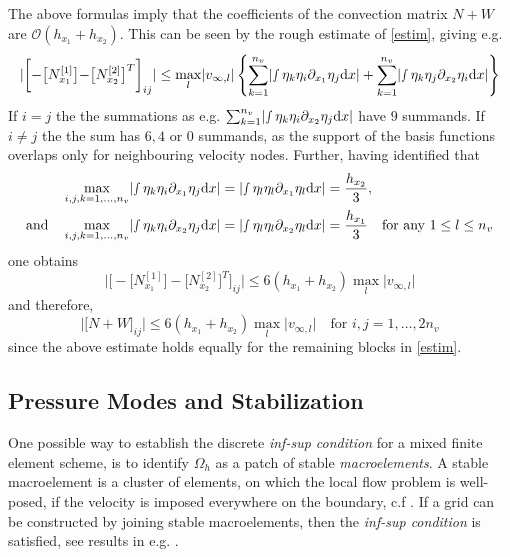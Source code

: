 \documentclass[a4paper,10pt,BCOR=15mm]{scrbook}
\providecommand{\abs}[1]{\lvert#1\rvert}
\providecommand{\inva}[1]{\text{d} #1}
\begin{document}
\begin{rem}\label{symd}
 The above formulas imply that the coefficients of the convection matrix $N+W$ are $\mathcal O(h_{x_1}+h_{x_2})$. This can be seen by the rough estimate of \eqref{estim}, giving e.g.
\begin{equation*}
 \abs{ \biggl [-\bigr [N_{x_1}^{[1]}\bigl]- \bigr[N_{x_2}^{[2]}\bigl]^T \biggr]_{ij}} \leq \max _l \abs{v_{\infty,l}}\left \{ \sum _{k=1}^{n_v}\abs{ \smallint \eta_k \eta_i \partial_{x_1} \eta_j\inva x} + \sum _{k=1}^{n_v}\abs{ \smallint \eta_k \eta_j \partial_{x_2} \eta_i\inva x}\right \}
\end{equation*}
If $i=j$ the the summations as e.g. $\sum _{k=1}^{n_v}\abs{ \smallint \eta_k \eta_i \partial_{x_2} \eta_j\inva x}$ have $9$ summands. If $i \neq j$ the the sum has $6,4$ or $0$ summands, as the support of the basis functions overlaps only for neighbouring velocity nodes. Further, having identified that
\begin{align*}
\max_{i,j,k=1,\dotsc,n_v} \abs{\smallint \eta_k \eta_i \partial_{x_1} \eta_j\inva x} &= \abs{\smallint \eta_l \eta_l  \partial_{x_1} \eta_l\inva x}= \frac{h_{x_2}}{3}, \\
\text{and}\quad \max_{i,j,k=1,\dotsc,n_v} \abs{\smallint \eta_k \eta_i \partial_{x_2} \eta_j\inva x} &= \abs{\smallint \eta_l \eta_l  \partial_{x_2} \eta_l\inva x}= \frac{h_{x_1}}{3} \quad \text{for any  }1\leq l \leq n_v
\end{align*}
one obtains
\begin{equation*}
 \abs{ \biggl [-\bigr [N_{x_1}^{[1]}\bigl]- \bigr[N_{x_2}^{[2]}\bigl]^T \biggr]_{ij}} \leq 6 (h_{x_1}+h_{x_2}) \max _l \abs{v_{\infty,l}}
\end{equation*}
and therefore, 
\begin{equation*}
 \abs{\bigl [ N+W \bigr ] _{ij}} \leq 6 (h_{x_1}+h_{x_2}) \max _l \abs{v_{\infty,l}} \quad \text{for }i,j=1,\dotsc,2n_v
\end{equation*}
since the above estimate holds equally for the remaining blocks in \eqref{estim}.
\end{rem}

\subsection{Pressure Modes and Stabilization}\label{pms}
One possible way to establish the discrete \textit{inf-sup condition} for a mixed finite element scheme, is to identify $\Omega_h$ as a patch of stable \textit{macroelements}. A stable macroelement is a cluster of elements, on which the local flow problem is well-posed, if the velocity is imposed everywhere on the boundary, c.f \cite{elma}. If a grid can be constructed by joining stable macroelements, then the \textit{inf-sup condition} is satisfied, see results in e.g. \cite{boni,sten}.
\end{document}

